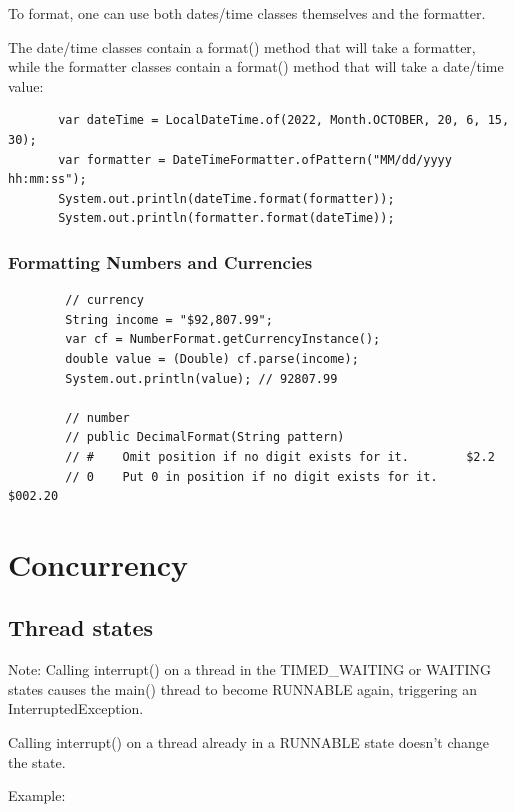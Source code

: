 \documentclass{scrartcl}
\begin{document}
    To format, one can use both dates/time classes themselves and the formatter.

    The date/time classes contain a format() method that will take a formatter, while the formatter classes contain a format() method that will take a date/time value:

    \begin{lstlisting}
       var dateTime = LocalDateTime.of(2022, Month.OCTOBER, 20, 6, 15, 30);
       var formatter = DateTimeFormatter.ofPattern("MM/dd/yyyy hh:mm:ss");
       System.out.println(dateTime.format(formatter));
       System.out.println(formatter.format(dateTime));
    \end{lstlisting}

\subsubsection{Formatting Numbers and Currencies}

    \begin{lstlisting}
        // currency
        String income = "$92,807.99";
        var cf = NumberFormat.getCurrencyInstance();
        double value = (Double) cf.parse(income);
        System.out.println(value); // 92807.99

        // number
        // public DecimalFormat(String pattern)
        // #	Omit position if no digit exists for it.		$2.2
        // 0	Put 0 in position if no digit exists for it.	$002.20
    \end{lstlisting}


\section{Concurrency}
\subsection{Thread states}

    Note: Calling interrupt()
    on a thread in the TIMED\_WAITING or WAITING states causes the main() thread to become RUNNABLE again, triggering an InterruptedException.

    Calling interrupt() on a thread already in a RUNNABLE state doesn’t change the state.

    Example:
\end{document}
